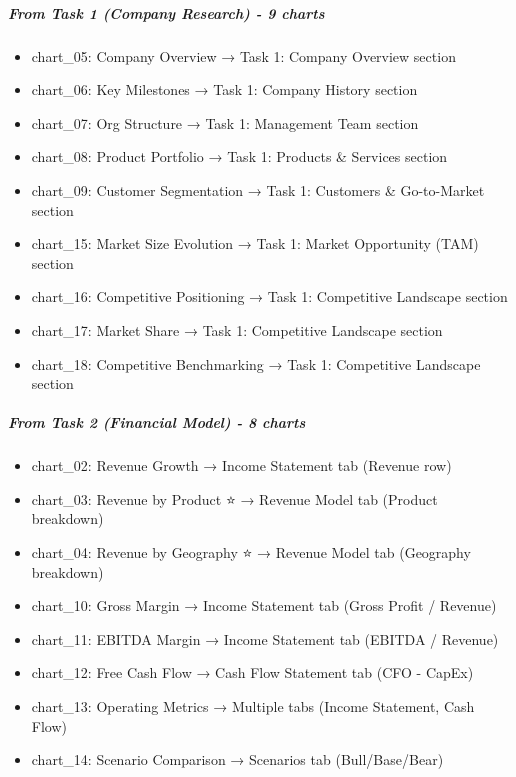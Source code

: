\documentclass[11pt]{article}
\begin{document}
\subparagraph{From Task 1 (Company Research) - 9 charts}\mbox{}\par
\begin{itemize}[leftmargin=*,itemsep=2pt,topsep=2pt]
\item {} chart\_\allowbreak{}05: Company Overview → Task 1: Company Overview section
\item {} chart\_\allowbreak{}06: Key Milestones → Task 1: Company History section
\item {} chart\_\allowbreak{}07: Org Structure → Task 1: Management Team section
\item {} chart\_\allowbreak{}08: Product Portfolio → Task 1: Products \& Services section
\item {} chart\_\allowbreak{}09: Customer Segmentation → Task 1: Customers \& Go-to-Market section
\item {} chart\_\allowbreak{}15: Market Size Evolution → Task 1: Market Opportunity (TAM) section
\item {} chart\_\allowbreak{}16: Competitive Positioning → Task 1: Competitive Landscape section
\item {} chart\_\allowbreak{}17: Market Share → Task 1: Competitive Landscape section
\item {} chart\_\allowbreak{}18: Competitive Benchmarking → Task 1: Competitive Landscape section
\end{itemize}

\subparagraph{From Task 2 (Financial Model) - 8 charts}\mbox{}\par
\begin{itemize}[leftmargin=*,itemsep=2pt,topsep=2pt]
\item {} chart\_\allowbreak{}02: Revenue Growth → Income Statement tab (Revenue row)
\item {} chart\_\allowbreak{}03: Revenue by Product ⭐ → Revenue Model tab (Product breakdown)
\item {} chart\_\allowbreak{}04: Revenue by Geography ⭐ → Revenue Model tab (Geography breakdown)
\item {} chart\_\allowbreak{}10: Gross Margin → Income Statement tab (Gross Profit / Revenue)
\item {} chart\_\allowbreak{}11: EBITDA Margin → Income Statement tab (EBITDA / Revenue)
\item {} chart\_\allowbreak{}12: Free Cash Flow → Cash Flow Statement tab (CFO - CapEx)
\item {} chart\_\allowbreak{}13: Operating Metrics → Multiple tabs (Income Statement, Cash Flow)
\item {} chart\_\allowbreak{}14: Scenario Comparison → Scenarios tab (Bull/Base/Bear)
\end{itemize}
\end{document}
